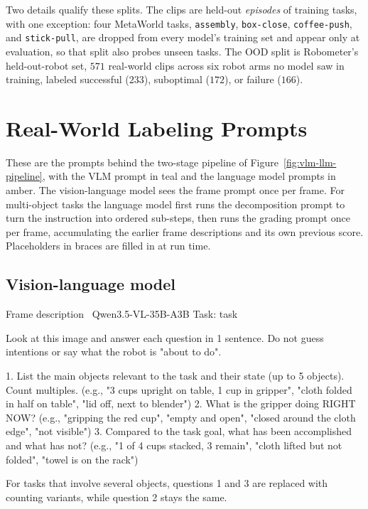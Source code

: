 Two details qualify these splits. The clips are held-out \emph{episodes} of training tasks, with one exception: four MetaWorld tasks, \texttt{assembly}, \texttt{box-close}, \texttt{coffee-push}, and \texttt{stick-pull}, are dropped from every model's training set and appear only at evaluation, so that split also probes unseen tasks. The OOD split is Robometer's held-out-robot set, $571$ real-world clips across six robot arms no model saw in training, labeled successful ($233$), suboptimal ($172$), or failure ($166$).

\chapter{Real-World Labeling Prompts}
\label{apx:prompts}

These are the prompts behind the two-stage pipeline of Figure~\ref{fig:vlm-llm-pipeline}, with the VLM prompt in teal and the language model prompts in amber. The vision-language model sees the frame prompt once per frame. For multi-object tasks the language model first runs the decomposition prompt to turn the instruction into ordered sub-steps, then runs the grading prompt once per frame, accumulating the earlier frame descriptions and its own previous score. Placeholders in braces are filled in at run time.

\section{Vision-language model}

\begin{vlmprompt}{Frame description \textbullet\ Qwen3.5-VL-35B-A3B}
Task: {task}

Look at this image and answer each question in 1 sentence. Do not guess intentions or say what the robot is "about to do".

1. List the main objects relevant to the task and their state (up to 5 objects). Count multiples. (e.g., "3 cups upright on table, 1 cup in gripper", "cloth folded in half on table", "lid off, next to blender")
2. What is the gripper doing RIGHT NOW? (e.g., "gripping the red cup", "empty and open", "closed around the cloth edge", "not visible")
3. Compared to the task goal, what has been accomplished and what has not? (e.g., "1 of 4 cups stacked, 3 remain", "cloth lifted but not folded", "towel is on the rack")
\end{vlmprompt}

For tasks that involve several objects, questions 1 and 3 are replaced with counting variants, while question 2 stays the same.

